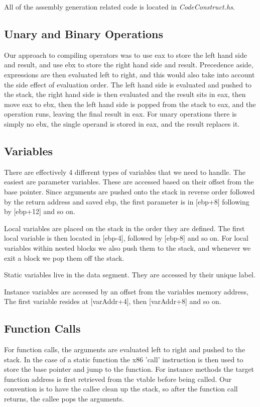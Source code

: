 \documentclass[12pt,letterpaper]{article}
\begin{document}
All of the assembly generation related code is located in \emph{CodeConstruct.hs}.

\subsection{Unary and Binary Operations}
Our approach to compiling operators was to use eax to store the left hand side and result, and use ebx to store the right hand side and result.
Precedence aside, expressions are then evaluated left to right, and this would also take into account the side effect of evaluation order.
The left hand side is evaluated and pushed to the stack, the right hand side is then evaluated and the result sits in eax, then move eax to ebx, then the left hand side is popped from the stack to eax, and the operation runs, leaving the final result in eax.
For unary operations there is simply no ebx, the single operand is stored in eax, and the result replaces it.

\subsection{Variables}
There are effectively 4 different types of variables that we need to handle.
The easiest are parameter variables. These are accessed based on their offset from the base pointer.
Since arguments are pushed onto the stack in reverse order followed by the return address and saved ebp, the first parameter is in [ebp+8] following by [ebp+12] and so on.

Local variables are placed on the stack in the order they are defined. The first local variable is then located in [ebp-4], followed by [ebp-8] and so on.
For local variables within nested blocks we also push them to the stack, and whenever we exit a block we pop them off the stack.

Static variables live in the data segment. They are accessed by their unique label.

Instance variables are accessed by an offset from the variables memory address, The first variable resides at [varAddr+4], then [varAddr+8] and so on.

\subsection{Function Calls}
For function calls, the arguments are evaluated left to right and pushed to the stack.
In the case of a static function the x86 'call' instruction is then used to store the base pointer and jump to the function.
For instance methods the target function address is first retrieved from the vtable before being called.
Our convention is to have the callee clean up the stack, so after the function call returns, the callee pops the arguments.
\end{document}
